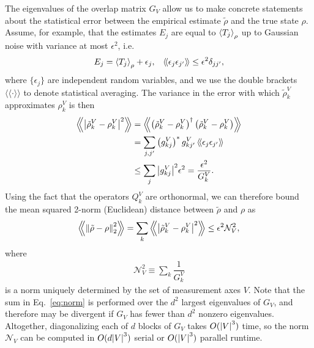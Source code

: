\documentclass[notitlepage,twocolumn]{revtex4-2}
\newcommand{\f}[2]{\dfrac{#1}{#2}} %
\newcommand{\p}[1]{\left(#1\right)} %
\renewcommand{\set}[1]{\{#1\}} %
\newcommand{\bk}{\Braket} %
\newcommand{\bbk}[1]{\langle\!\langle #1 \rangle\!\rangle}
\newcommand{\Bbk}[1]
{\left\langle\!\!\left\langle #1 \right\rangle\!\!\right\rangle}
\newcommand{\1}{\mathds{1}}
\newcommand{\N}{\mathcal{N}}
\begin{document}
The eigenvalues of the overlap matrix $G_V$ allow us to make concrete statements about the statistical error between the empirical estimate $\tilde\rho$ and the true state $\rho$.
Assume, for example, that the estimates $E_j$ are equal to $\bk{T_j}_\rho$ up to Gaussian noise with variance at most $\epsilon^2$, i.e.
\begin{align}
  E_j = \bk{T_j}_\rho + \epsilon_j,
  &&
  \bbk{\epsilon_j \epsilon_{j'}} \le \epsilon^2 \delta_{jj'},
\end{align}
where $\set{\epsilon_j}$ are independent random variables, and we use the double brackets $\bbk{\cdot}$ to denote statistical averaging.
The variance in the error with which $\tilde\rho^V_k$ approximates $\rho^V_k$ is then
\begin{align}
  \Bbk{\abs{\tilde\rho^V_k-\rho^V_k}^2}
  &= \Bbk{\p{\tilde\rho^V_k-\rho^V_k}^\dag \p{\tilde\rho^V_k-\rho^V_k}} \\
  &= \sum_{j,j'} \p{g^V_{kj}}^* g^V_{kj'}\,
  \bbk{\epsilon_j \epsilon_{j'}} \\
  &\le \sum_j \abs{g^V_{kj}}^2 \epsilon^2
  = \f{\epsilon^2}{G^V_k}.
\end{align}
Using the fact that the operators $Q^V_k$ are orthonormal, we can therefore bound the mean squared 2-norm (Euclidean) distance between $\tilde\rho$ and $\rho$ as
\begin{align}
  \Bbk{\norm{\tilde\rho-\rho}_2^2}
  = \sum_k \Bbk{\abs{\tilde\rho^V_k - \rho^V_k}^2}
  \le \epsilon^2 \N_V^2,
  \label{eq:bound}
\end{align}
where
\begin{align}
  \N_V^2 \equiv \sum_k \f1{G^V_k}
  \label{eq:norm}
\end{align}
is a norm uniquely determined by the set of measurement axes $V$.
Note that the sum in Eq.~\eqref{eq:norm} is performed over the $d^2$ largest eigenvalues of $G_V$, and therefore may be divergent if $G_V$ has fewer than $d^2$ nonzero eigenvalues.
Altogether, diagonalizing each of $d$ blocks of $G_V$ takes $O(\abs{V}^3)$ time, so the norm $\N_V$ can be computed in $O(d\abs{V}^3)$ serial or $O(\abs{V}^3)$ parallel runtime.
\end{document}

